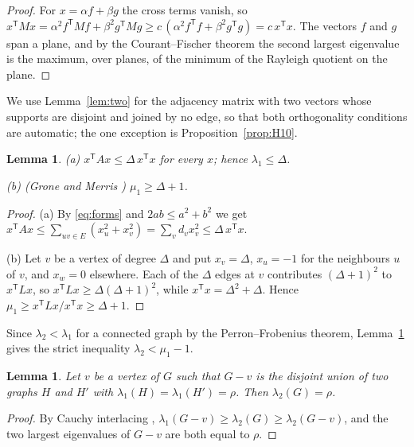 \documentclass[11pt]{amsart}
\newtheorem{lemma}[theorem]{Lemma}
\theoremstyle{definition}
\theoremstyle{remark}
\newcommand{\tr}{^{\mathsf{T}}}
\begin{document}
\begin{proof}
For $x=\alpha f+\beta g$ the cross terms vanish, so
$x\tr Mx=\alpha^2f\tr Mf+\beta^2g\tr Mg\ge c\,(\alpha^2f\tr f+\beta^2g\tr g)=c\,x\tr x$. The vectors
$f$ and $g$ span a plane, and by the Courant--Fischer theorem \cite[Section~4.2]{HornJohnson}
the second largest eigenvalue is the maximum, over planes, of the minimum of the Rayleigh
quotient on the plane.
\end{proof}

We use Lemma~\ref{lem:two} for the adjacency matrix with two vectors whose supports are disjoint
and joined by no edge, so that both orthogonality conditions are automatic; the one exception is
Proposition~\ref{prop:H10}.

\begin{lemma}\label{lem:degree}
\textup{(a)} $x\tr Ax\le\Delta\,x\tr x$ for every $x$; hence $\lambda_1\le\Delta$.

\textup{(b)} \textup{(Grone and Merris \cite{GroneMerris})} $\mu_1\ge\Delta+1$.
\end{lemma}

\begin{proof}
(a) By \eqref{eq:forms} and $2ab\le a^2+b^2$ we get
$x\tr Ax\le\sum_{uv\in E}(x_u^2+x_v^2)=\sum_vd_vx_v^2\le\Delta\,x\tr x$.

(b) Let $v$ be a vertex of degree $\Delta$ and put $x_v=\Delta$, $x_u=-1$ for the neighbours $u$
of $v$, and $x_w=0$ elsewhere. Each of the $\Delta$ edges at $v$ contributes $(\Delta+1)^2$ to
$x\tr Lx$, so $x\tr Lx\ge\Delta(\Delta+1)^2$, while $x\tr x=\Delta^2+\Delta$. Hence
$\mu_1\ge x\tr Lx/x\tr x\ge\Delta+1$.
\end{proof}

Since $\lambda_2<\lambda_1$ for a connected graph by the Perron--Frobenius theorem,
Lemma~\ref{lem:degree} gives the strict inequality $\lambda_2<\mu_1-1$.

\begin{lemma}\label{lem:interlace}
Let $v$ be a vertex of $G$ such that $G-v$ is the disjoint union of two graphs $H$ and $H'$ with
$\lambda_1(H)=\lambda_1(H')=\rho$. Then $\lambda_2(G)=\rho$.
\end{lemma}

\begin{proof}
By Cauchy interlacing \cite[Section~2.5]{BrouwerHaemers},
$\lambda_1(G-v)\ge\lambda_2(G)\ge\lambda_2(G-v)$, and the two largest eigenvalues of $G-v$ are
both equal to $\rho$.
\end{proof}
\end{document}
